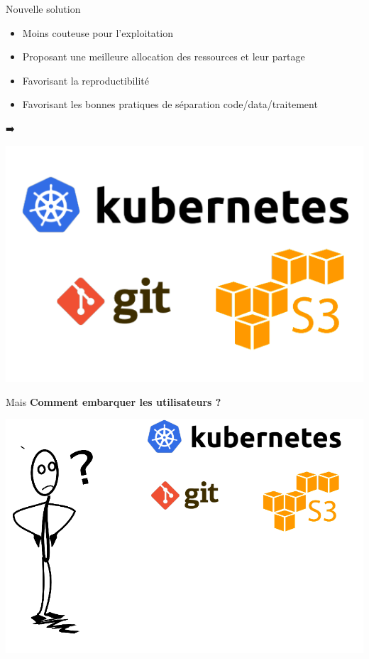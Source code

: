 \documentclass[
  12pt,
  ignorenonframetext,
  aspectratio=169,
  french,
  aspectratio=169]{beamer}
\providecommand{\tightlist}{%
  \setlength{\itemsep}{0pt}\setlength{\parskip}{0pt}}
\begin{document}
\begin{frame}{Nouvelle solution}
\label{nouvelle-solution}
\begin{itemize}
\tightlist
\item
  Moins couteuse pour l'exploitation
\item
  Proposant une meilleure allocation des ressources et leur partage
\item
  Favorisant la reproductibilité
\item
  Favorisant les bonnes pratiques de séparation code/data/traitement
\end{itemize}

➡️

\includegraphics[width=\linewidth,height=0.5\textheight,keepaspectratio]{img/kube-git-s3-transparent.png}
\end{frame}

\begin{frame}{Mais}
\label{mais}
\textbf{Comment embarquer les utilisateurs ?}

\includegraphics[width=\linewidth,height=0.5\textheight,keepaspectratio]{img/chercheur-perplexe-transparent.png}
\end{frame}
\end{document}
